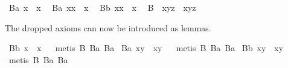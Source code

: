 \begin{isabellebody}
\ B{}a{\isacharcolon}\ {\isachardoublequoteopen}{\isacharparenleft}{\isacharparenleft}{\isasymbox}x{\isacharparenright}{\isasymbox}{\isacharparenright}\ {\isasymapprox}\ {\isasymbox}x{\isachardoublequoteclose}\ \isanewline
\ B{}a{\isacharcolon}\ {\isachardoublequoteopen}{\isacharparenleft}{\isasymbox}x{\isacharparenright}{\isasymcdot}x\ {\isasymapprox}\ x{\isachardoublequoteclose}\ \isanewline
\ B{}b{\isacharcolon}\ {\isachardoublequoteopen}x{\isasymcdot}{\isacharparenleft}x{\isasymbox}{\isacharparenright}\ {\isasymapprox}\ x{\isachardoublequoteclose}\ \isanewline
\ B{}{\isacharcolon}\ \ {\isachardoublequoteopen}x{\isasymcdot}{\isacharparenleft}y{\isasymcdot}z{\isacharparenright}\ {\isasymapprox}\ {\isacharparenleft}x{\isasymcdot}y{\isacharparenright}{\isasymcdot}z{\isachardoublequoteclose}%
\begin{isamarkuptext}%
The dropped axioms can now be introduced as lemmas.%
\end{isamarkuptext}%
\isamarkuptrue%
\isamarkupfalse%
\ B{}b{\isacharcolon}\ {\isachardoublequoteopen}{\isasymbox}{\isacharparenleft}x{\isasymbox}{\isacharparenright}\ {\isasymapprox}\ {\isasymbox}x{\isachardoublequoteclose}%
\isadelimproof
\ %
\endisadelimproof
%
\isatagproof
{}\isamarkupfalse%
\ {\isacharparenleft}metis\ B{}\ B{}a\ B{}a{\isacharparenright}%
\endisatagproof
{\isafoldproof}%
%
\isadelimproof
%
\endisadelimproof
\isanewline
{}\isamarkupfalse%
\ B{}a{\isacharcolon}\ {\isachardoublequoteopen}{\isasymbox}{\isacharparenleft}x{\isasymcdot}y{\isacharparenright}\ {\isasymapprox}\ {\isasymbox}{\isacharparenleft}x{\isasymcdot}{\isacharparenleft}{\isasymbox}y{\isacharparenright}{\isacharparenright}{\isachardoublequoteclose}%
\isadelimproof
\ %
\endisadelimproof
%
\isatagproof
{}\isamarkupfalse%
\ {\isacharparenleft}metis\ B{}\ B{}a\ B{}a{\isacharparenright}%
\endisatagproof
{\isafoldproof}%
%
\isadelimproof
%
\endisadelimproof
\isanewline
{}\isamarkupfalse%
\ B{}b{\isacharcolon}\ {\isachardoublequoteopen}{\isacharparenleft}x{\isasymcdot}y{\isacharparenright}{\isasymbox}\ {\isasymapprox}\ {\isacharparenleft}{\isacharparenleft}x{\isasymbox}{\isacharparenright}{\isasymcdot}y{\isacharparenright}{\isasymbox}{\isachardoublequoteclose}%
\isadelimproof
\ %
\endisadelimproof
%
\isatagproof
{}\isamarkupfalse%
\ {\isacharparenleft}metis\ B{}\ B{}a\ B{}a{\isacharparenright}%

\end{isabellebody}
